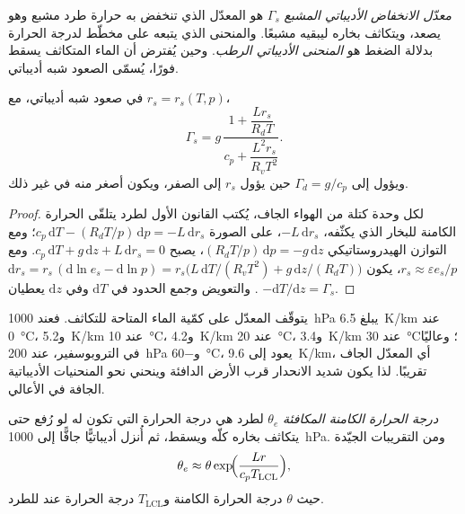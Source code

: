\begin{definition}\label{def:b2:atmospheric-thermodynamics:moist-adiabat}
\emph{معدّل الانخفاض الأديباتي المشبع} $\Gamma_s$ هو
المعدّل الذي تنخفض به حرارة طرد مشبع وهو يصعد، ويتكاثف بخاره
ليبقيه مشبعًا. والمنحنى الذي يتبعه على مخطّط لدرجة الحرارة بدلالة الضغط هو
\emph{المنحنى الأديباتي الرطب}. وحين يُفترض أن الماء المتكاثف يسقط
فورًا، يُسمّى الصعود شبه أديباتي.
\end{definition}

\begin{proposition}\label{prop:b2:atmospheric-thermodynamics:gamma-s}
في صعود شبه أديباتي، مع $r_s = r_s(T, p)$،
\[
  \Gamma_s = g\,\frac{1 + \dfrac{L r_s}{R_d T}}{c_p + \dfrac{L^2 r_s}{R_v T^2}} .
\]
ويؤول إلى $\Gamma_d = g/c_p$ حين يؤول $r_s$ إلى الصفر، ويكون أصغر منه في غير ذلك.
\end{proposition}

\begin{proof}
لكل وحدة كتلة من الهواء الجاف، يُكتب القانون الأول لطرد يتلقّى الحرارة الكامنة للبخار
الذي يكثّفه، $-L\,\mathrm{d}r_s$، على الصورة $c_p\,\mathrm{d}T - (R_dT/p)\,\mathrm{d}p = -L\,
\mathrm{d}r_s$؛ ومع التوازن الهيدروستاتيكي $(R_dT/p)\,\mathrm{d}p = -g\,\mathrm{d}z$، يصبح
$c_p\,\mathrm{d}T + g\,\mathrm{d}z + L\,\mathrm{d}r_s = 0$. ومع $r_s \approx \varepsilon e_s/p$،
يكون $\mathrm{d}r_s = r_s\,(\mathrm{d}\ln e_s - \mathrm{d}\ln p) = r_s\bigl(L\,\mathrm{d}T/(R_vT^2) +
g\,\mathrm{d}z/(R_dT)\bigr)$. والتعويض وجمع الحدود في $\mathrm{d}T$ وفي
$\mathrm{d}z$ يعطيان $-\mathrm{d}T/\mathrm{d}z = \Gamma_s$.
\end{proof}

يتوقّف المعدّل على كمّية الماء المتاحة للتكاثف. فعند \qty{1000}{hPa} يبلغ
\qty{6.5}{K/km} عند \qty{0}{\celsius}، و\qty{5.2}{K/km} عند \qty{10}{\celsius}، و\qty{4.2}{K/km} عند
\qty{20}{\celsius}، و\qty{3.4}{K/km} عند \qty{30}{\celsius}؛ وعاليًا في التروبوسفير، عند
\qty{200}{hPa} و\qty{-60}{\celsius}، يعود إلى \qty{9.6}{K/km}، أي المعدّل الجاف تقريبًا. لذا
يكون  شديد الانحدار قرب الأرض الدافئة وينحني نحو المنحنيات الأديباتية الجافة في الأعالي.

\begin{definition}\label{def:b2:atmospheric-thermodynamics:theta-e}
\emph{درجة الحرارة الكامنة المكافئة} $\theta_e$
لطرد هي درجة الحرارة التي تكون له لو رُفع حتى يتكاثف بخاره كلّه
ويسقط، ثم أُنزل أديباتيًّا جافًّا إلى \qty{1000}{hPa}. ومن التقريبات الجيّدة
\[
  \theta_e \approx \theta \exp\!\Bigl(\frac{L r}{c_p T_{\text{LCL}}}\Bigr),
\]
حيث $\theta$ درجة الحرارة الكامنة و$T_{\text{LCL}}$ درجة الحرارة عند 
للطرد.
\end{definition}

